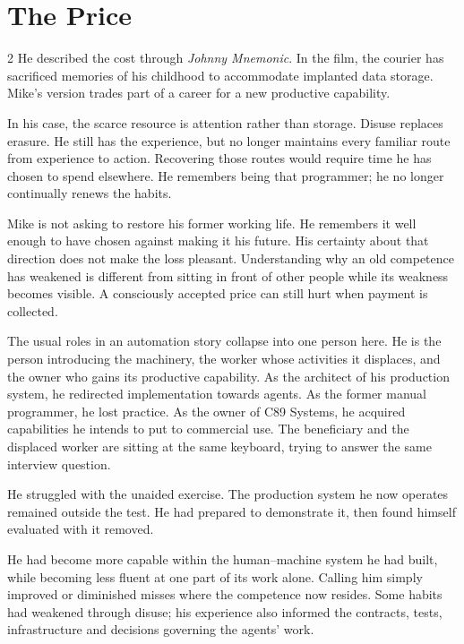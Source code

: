 \section*{The Price}
\begin{multicols}{2}
\noindent He described the cost through \emph{Johnny Mnemonic}. In the film, the courier has sacrificed memories of his childhood to accommodate implanted data storage. Mike's version trades part of a career for a new productive capability.

In his case, the scarce resource is attention rather than storage. Disuse replaces erasure. He still has the experience, but no longer maintains every familiar route from experience to action. Recovering those routes would require time he has chosen to spend elsewhere. He remembers being that programmer; he no longer continually renews the habits.


Mike is not asking to restore his former working life. He remembers it well enough to have chosen against making it his future. His certainty about that direction does not make the loss pleasant. Understanding why an old competence has weakened is different from sitting in front of other people while its weakness becomes visible. A consciously accepted price can still hurt when payment is collected.

The usual roles in an automation story collapse into one person here. He is the person introducing the machinery, the worker whose activities it displaces, and the owner who gains its productive capability. As the architect of his production system, he redirected implementation towards agents. As the former manual programmer, he lost practice. As the owner of C89 Systems, he acquired capabilities he intends to put to commercial use. The beneficiary and the displaced worker are sitting at the same keyboard, trying to answer the same interview question.

\columnbreak

He struggled with the unaided exercise. The production system he now operates remained outside the test. He had prepared to demonstrate it, then found himself evaluated with it removed.

He had become more capable within the human--machine system he had built, while becoming less fluent at one part of its work alone. Calling him simply improved or diminished misses where the competence now resides. Some habits had weakened through disuse; his experience also informed the contracts, tests, infrastructure and decisions governing the agents' work.


\end{multicols}
